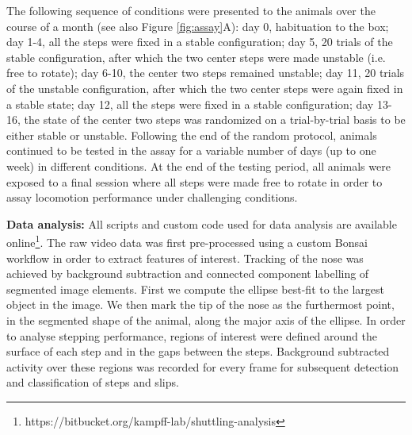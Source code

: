 The following sequence of conditions were presented to the animals over the course of a month (see also Figure \ref{fig:assay}A): day 0, habituation to the box; day 1-4, all the steps were fixed in a stable configuration; day 5, 20 trials of the stable configuration, after which the two center steps were made unstable (i.e. free to rotate); day 6-10, the center two steps remained unstable; day 11, 20 trials of the unstable configuration, after which the two center steps were again fixed in a stable state; day 12, all the steps were fixed in a stable configuration; day 13-16, the state of the center two steps was randomized on a trial-by-trial basis to be either stable or unstable. Following the end of the random protocol, animals continued to be tested in the assay for a variable number of days (up to one week) in different conditions. At the end of the testing period, all animals were exposed to a final session where all steps were made free to rotate in order to assay locomotion performance under challenging conditions.

\textbf{Data analysis:} All scripts and custom code used for data analysis are available online\footnote{https://bitbucket.org/kampff-lab/shuttling-analysis}. The raw video data was first pre-processed using a custom Bonsai workflow in order to extract features of interest. Tracking of the nose was achieved by background subtraction and connected component labelling of segmented image elements. First we compute the ellipse best-fit to the largest object in the image. We then mark the tip of the nose as the furthermost point, in the segmented shape of the animal, along the major axis of the ellipse. In order to analyse stepping performance, regions of interest were defined around the surface of each step and in the gaps between the steps. Background subtracted activity over these regions was recorded for every frame for subsequent detection and classification of steps and slips.

